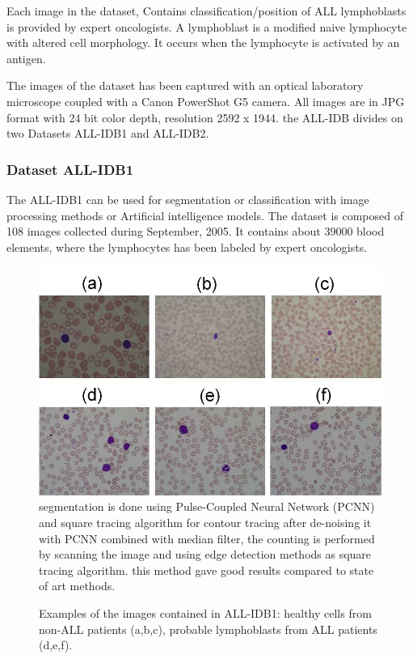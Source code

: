 Each image in the dataset, Contains classification/position of ALL lymphoblasts is provided by expert oncologists. A lymphoblast is a modified naive lymphocyte with altered cell morphology. It occurs when the lymphocyte is activated by an antigen.\

The images of the dataset has been captured with an optical laboratory microscope coupled with a Canon PowerShot G5 camera. All images are in JPG format with 24 bit color depth, resolution 2592 x 1944. the ALL-IDB divides on two Datasets ALL-IDB1 and ALL-IDB2.\

\subsubsection{Dataset ALL-IDB1}
\hspace{\parindent}
The ALL-IDB1 can be used for segmentation or classification with image processing methods or Artificial intelligence models. The dataset is composed of 108 images collected during September, 2005. It contains about 39000 blood elements, where the lymphocytes has been labeled by expert oncologists.

\begin{figure}[H]
\centering
\includegraphics[width=5.8in]{../images/ALLIDB1.jpg}segmentation is done using Pulse-Coupled Neural Network (PCNN) and square tracing algorithm for contour tracing after de-noising it with PCNN combined with median filter, the counting is performed by scanning the image and using edge detection methods as square tracing algorithm. this method gave good results compared to state of art methods.\\


\caption{Examples of the images contained in ALL-IDB1: healthy cells from non-ALL patients (a,b,c), probable lymphoblasts from ALL patients (d,e,f). }
\end{figure}

